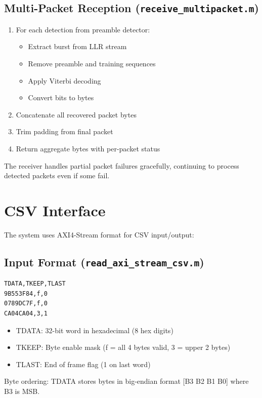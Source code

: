\documentclass[12pt]{article}
\begin{document}
\subsection{Multi-Packet Reception (\texttt{receive\_multipacket.m})}
\begin{enumerate}
    \item For each detection from preamble detector:
    \begin{itemize}
        \item Extract burst from LLR stream
        \item Remove preamble and training sequences
        \item Apply Viterbi decoding
        \item Convert bits to bytes
    \end{itemize}
    \item Concatenate all recovered packet bytes
    \item Trim padding from final packet
    \item Return aggregate bytes with per-packet status
\end{enumerate}

The receiver handles partial packet failures gracefully, continuing to process detected packets even if some fail.

\section{CSV Interface}

The system uses AXI4-Stream format for CSV input/output:

\subsection{Input Format (\texttt{read\_axi\_stream\_csv.m})}
\begin{verbatim}
TDATA,TKEEP,TLAST
9B553F84,f,0
0789DC7F,f,0
CA04CA04,3,1
\end{verbatim}

\begin{itemize}
    \item TDATA: 32-bit word in hexadecimal (8 hex digits)
    \item TKEEP: Byte enable mask (f = all 4 bytes valid, 3 = upper 2 bytes)
    \item TLAST: End of frame flag (1 on last word)
\end{itemize}

Byte ordering: TDATA stores bytes in big-endian format [B3 B2 B1 B0] where B3 is MSB.
\end{document}
